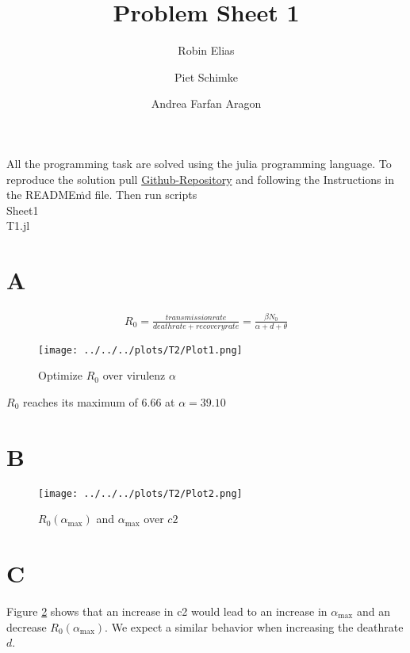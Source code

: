 \documentclass{article}
\title{Problem Sheet 1}
\author{Robin Elias \and Piet Schimke \and Andrea Farfan Aragon}
\date{}
\begin{document}
\maketitle
\begin{center}
    All the programming task are solved using the julia programming language.
    To reproduce the solution pull \href{https://github.com/relias96/Epidemiologie/tree/main/scripts/Sheet_5-6}{Github-Repository} and following the Instructions in the README\.md file.
    Then run scripts\\Sheet1\\T1.jl
\end{center}
 
\section*{A}

\begin{equation}
    \begin{split}
        R_0 = \frac{transmissionrate}{deathrate + recoveryrate} = \frac{\beta N_0}{\alpha + d + \theta}
    \end{split}
\end{equation}

\begin{figure}[H]
    \centering
    \texttt{[image: ../../../plots/T2/Plot1.png]}
    \caption{Optimize $R_0$ over virulenz $\alpha$}\label{fig:R0}
\end{figure}

$R_0$ reaches its maximum of $6.66$ at $\alpha = 39.10$

\section*{B}
\begin{figure}[H]
    \centering
    \texttt{[image: ../../../plots/T2/Plot2.png]}
    \caption{$R_0(\alpha_{\max})$ and $\alpha_{\max}$ over $c2$ }\label{fig:c2}
\end{figure}

\section*{C}

Figure \ref*{fig:c2} shows that an increase in c2 would lead to an increase in $\alpha_{\max}$ and an decrease $R_0(\alpha_{\max})$. We expect a similar behavior when increasing the deathrate $d$.
\end{document}
